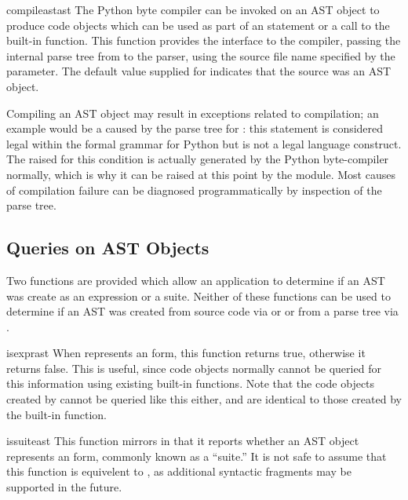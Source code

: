 \begin{funcdesc}{compileast}{ast}
The Python byte compiler can be invoked on an AST object to produce
code objects which can be used as part of an  statement or
a call to the built-in  function.
This function provides the interface to the compiler, passing the
internal parse tree from  to the parser, using the
source file name specified by the  parameter.
The default value supplied for  indicates that
the source was an AST object.

Compiling an AST object may result in exceptions related to
compilation; an example would be a  caused by the
parse tree for : this statement is considered legal
within the formal grammar for Python but is not a legal language
construct.  The  raised for this condition is
actually generated by the Python byte-compiler normally, which is why
it can be raised at this point by the  module.  Most
causes of compilation failure can be diagnosed programmatically by
inspection of the parse tree.
\end{funcdesc}


\subsection{Queries on AST Objects}
\label{Querying ASTs}

Two functions are provided which allow an application to determine if
an AST was create as an expression or a suite.  Neither of these
functions can be used to determine if an AST was created from source
code via  or  or from a parse tree
via .

\begin{funcdesc}{isexpr}{ast}
When  represents an  form, this function
returns true, otherwise it returns false.  This is useful, since code
objects normally cannot be queried for this information using existing
built-in functions.  Note that the code objects created by
 cannot be queried like this either, and are
identical to those created by the built-in
 function.
\end{funcdesc}


\begin{funcdesc}{issuite}{ast}
This function mirrors  in that it reports whether an
AST object represents an  form, commonly known as a
``suite.''  It is not safe to assume that this function is equivelent
to , as additional syntactic fragments may
be supported in the future.
\end{funcdesc}


